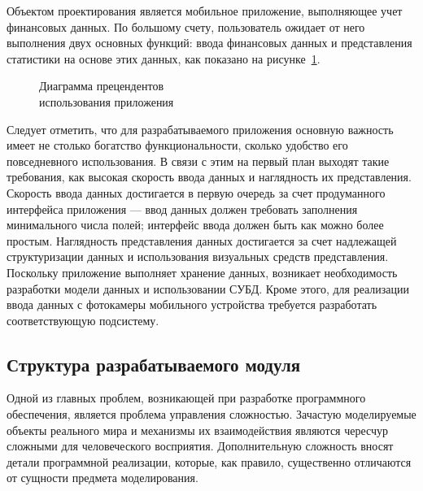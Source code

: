 Объектом проектирования является мобильное приложение,
выполняющее учет финансовых данных. По большому счету, пользователь
ожидает от него выполнения двух основных функций:
ввода финансовых данных и представления статистики на основе этих данных,
как показано на рисунке~\ref{fig:design_use_cases}.

\begin{figure}[h!]
  \centering
  \caption{Диаграмма прецендентов \\ использования приложения}
  \label{fig:design_use_cases}
\end{figure}

Следует отметить, что для разрабатываемого приложения основную важность
имеет не столько богатство функциональности,
сколько удобство его повседневного использования.
В связи с этим на первый план выходят такие требования, как
высокая скорость ввода данных и наглядность их представления.
Скорость ввода данных достигается в первую очередь за счет
продуманного интерфейса приложения ---
ввод данных должен требовать заполнения минимального числа полей;
интерфейс ввода должен быть как можно более простым.
Наглядность представления данных достигается за счет надлежащей
структуризации данных и использования визуальных средств представления.
Поскольку приложение выполняет хранение данных, возникает необходимость
разработки модели данных и использовании СУБД.
Кроме этого, для реализации ввода данных с
фотокамеры мобильного устройства
требуется разработать соответствующую подсистему.

\subsection{Структура разрабатываемого модуля}
\label{subsec:design_structure}

Одной из главных проблем, возникающей при разработке программного обеспечения,
является проблема управления сложностью. Зачастую моделируемые объекты реального
мира и механизмы их взаимодействия являются чересчур сложными для человеческого восприятия.
Дополнительную сложность вносят детали программной
реализации, которые, как правило, существенно отличаются
от сущности предмета моделирования.

